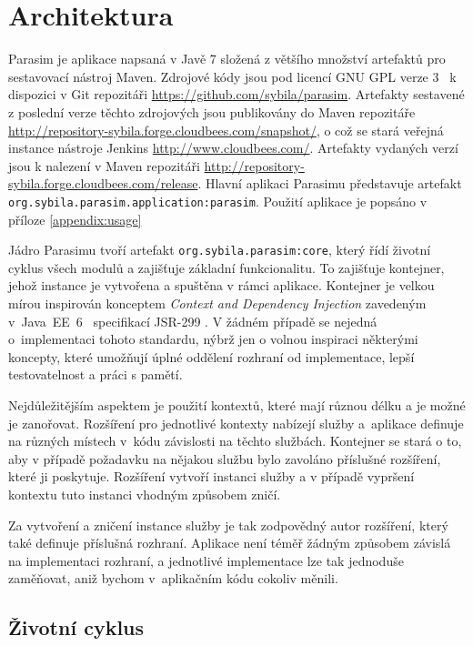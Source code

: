 \section{Architektura}

Parasim je aplikace napsaná v Javě 7 složená z většího množství artefaktů pro
sestavovací nástroj Maven. Zdrojové kódy jsou pod licencí GNU GPL verze 3~\cite{gpl} k dispozici
v Git \cite{chacon2009} repozitáři \url{https://github.com/sybila/parasim}. Artefakty sestavené
z poslední verze těchto zdrojových jsou publikovány do Maven repozitáře
\url{http://repository-sybila.forge.cloudbees.com/snapshot/}, o což se stará veřejná
instance nástroje Jenkins \cite{jenkins} \url{http://www.cloudbees.com/}. Artefakty
vydaných verzí jsou k nalezení v Maven repozitáři \url{http://repository-sybila.forge.cloudbees.com/release}.
Hlavní aplikaci Parasimu představuje artefakt \texttt{org.sybila.parasim.application:parasim}.
Pou\-ži\-tí aplikace je popsáno v příloze \ref{appendix:usage}

Jádro Parasimu tvoří artefakt \texttt{org.sybila.parasim:core}, který řídí ži\-vot\-ní
cyklus všech modulů a zajišťuje základní funkcionalitu. To zajišťuje kontejner,
jehož instance je vytvořena a spuštěna v rámci aplikace. Kontejner je velkou mírou inspi\-ro\-ván
konceptem \textit{Context and Dependency Injection} zavedeným v~Java~EE~6~\cite{jendrock2010} specifikací
JSR-299 \cite{jsr299}. V žádném případě se nejedná o~implementaci tohoto standardu,
nýbrž jen o volnou inspiraci některými koncepty, které umožňují úplné oddělení rozhraní
od implementace, lepší testovatelnost a práci s pamětí.

Nejdůležitějším aspektem je použití kontextů, které mají různou délku a je možné je za\-no\-řo\-vat.
Rozšíření pro jednotlivé kontexty nabízejí služby a~aplikace definuje na různých
místech v~kódu závislosti na těchto službách. Kontejner se stará o to,
aby v případě požadavku na nějakou službu bylo zavoláno příslušné rozšíření,
které ji poskytuje. Rozšíření vytvoří instanci služby a v případě vy\-pr\-še\-ní kontextu
tuto instanci vhodným způsobem zničí.

Za vytvoření a zničení instance služby je tak zodpovědný autor rozšíření,
který také definuje příslušná rozhraní. Aplikace není téměř žádným způ\-so\-bem závislá
na implementaci rozhraní, a jednotlivé implementace lze tak jednoduše zaměňovat,
aniž bychom v~aplikačním kódu cokoliv mě\-ni\-li.

\subsection{Životní cyklus}

